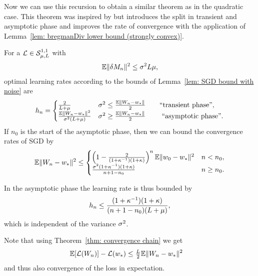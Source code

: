 Now we can use this recursion to obtain a similar theorem as in the quadratic
case. This theorem was inspired by
\textcite{nemirovskiRobustStochasticApproximation2009} but introduces the split
in transient and asymptotic phase and improves the rate of convergence with the
application of Lemma~\ref{lem: bregmanDiv lower bound (strongly convex)}.

\begin{theorem}\label{thm: optimal rates SGD}
	For a \(\mathcal{L}\in\mathcal{S}^{1,1}_{{\mu},{L}}\) with
	\begin{align*}
		\mathbb{E}\|\delta M_n\|^2 \le \sigma^2L\mu,
	\end{align*}
	optimal learning rates according to the bounds of Lemma~\ref{lem: SGD bound with noise} are
	\begin{align*}
		h_n
		= \begin{cases}
			\frac{2}{L+\mu}
			& \sigma^2 \le \frac{\mathbb{E}\|W_n - w_*\|}{2}
			\qquad \text{``transient phase''},\\
			\frac{\mathbb{E}\|W_n -w_*\|^2}{\sigma^2(L+\mu)}
			& \sigma^2 \ge \frac{\mathbb{E}\|W_n - w_*\|}{2}
			\qquad \text{ ``asymptotic phase''}.
		\end{cases}
	\end{align*}
	If \(n_0\) is the start of the asymptotic phase, then we can bound the
	convergence rates of SGD by
	\begin{align*}
		\mathbb{E}\|W_n - w_*\|^2
		\le \begin{cases}
			\left(1-\frac{2}{(1+\kappa^{-1})(1+\kappa)}\right)^n\mathbb{E}\|w_0 -w_*\|^2
			& n < n_0,\\
			\frac{\sigma^2(1+\kappa^{-1})(1+\kappa)}{n+1-n_0} & n \ge n_0.
		\end{cases}
	\end{align*}
\end{theorem}
\begin{remark}
	In the asymptotic phase the learning rate is thus bounded by
	\begin{align*}
		h_n \le \frac{(1+\kappa^{-1})(1+\kappa)}{(n+1-n_0)(L + \mu)},
	\end{align*}
	which is independent of the variance \(\sigma^2\).
\end{remark}
\begin{remark}\label{rem: expected loss is a special case of L2 weight convergence}
	Note that using Theorem~\ref{thm: convergence chain} we get
	\begin{align*}
		\mathbb{E}[\mathcal{L}(W_n)]- \mathcal{L}(w_*)
		&\le \tfrac{L}{2}\mathbb{E}\|W_n-w_*\|^2
	\end{align*}
	and thus also convergence of the loss in expectation.
\end{remark}


